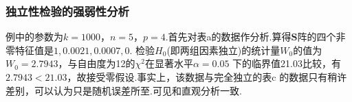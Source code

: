 \begin{frame}
\end{frame}
\begin{frame}\frametitle{\color{blue}独立性检验的强弱性分析}
 \begin{footnotesize}
   \quad\quad 例中的参数为$k=1000$，$n=5$，$p=4$.首先对表a的数据作分析.算得$\mathbf{S}$阵的四个非零特征值是$1, 0.0021, 0.0007, 0$.
检验$H_{0}$(即两组因素独立)的统计量$W_{0}$的值为$W_{0}=2.7943$，与自由度为12的$\chi^{2}$在显著水平$\alpha=0.05$
下的临界值21.03比较，有$2.7943<21.03$，故接受零假设.事实上，该数据与完全独立的表c
的数据只有稍许差别，可以认为只是随机误差所至.可见和直观分析一致.
\end{footnotesize}
\end{frame}
